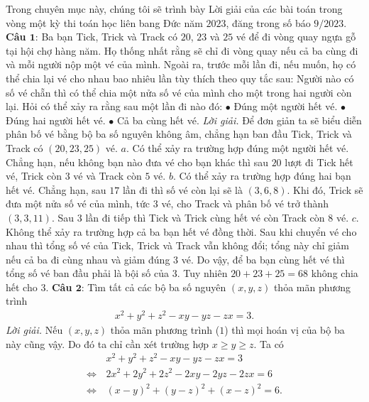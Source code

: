 \begin{multicols}{2}
	Trong chuyên mục này, chúng tôi sẽ trình bày Lời giải của các bài toán trong vòng một kỳ thi toán học liên bang Đức năm $2023$, đăng trong số báo $9/2023$. 
	\vskip 0.1cm
	\textbf{\color{cackithi}Câu $\pmb{1}$}: Ba bạn Tick, Trick và Track có $20$, $23$ và $25$ vé để đi vòng quay ngựa gỗ tại hội chợ hàng năm. Họ thống nhất rằng sẽ chỉ đi vòng quay nếu cả ba cùng đi và mỗi người nộp một vé của mình. Ngoài ra, trước mỗi lần đi, nếu muốn, họ có thể chia lại vé cho nhau bao nhiêu lần tùy thích theo quy tắc sau: Người nào có số vé chẵn thì có thể chia một nửa số vé của mình cho một trong hai người còn lại. Hỏi có thể xảy ra rằng sau một lần đi nào đó:
	\vskip 0.1cm
	$\bullet$ Đúng một người hết vé.
	\vskip 0.1cm
	$\bullet$ Đúng hai người hết vé.
	\vskip 0.1cm
	$\bullet$ Cả ba cùng hết vé. 
	\vskip 0.1cm
	\textit{Lời giải.}
	Để đơn giản ta sẽ biểu diễn phân bố vé bằng bộ ba số nguyên không âm, chẳng hạn ban đầu Tick, Trick và Track có $(20,23,25)$ vé.
	\vskip 0.1cm	
	$a.$ Có thể xảy ra trường hợp đúng một người hết vé. Chẳng hạn, nếu không bạn nào đưa vé cho bạn khác thì sau $20$ lượt đi Tick hết vé, Trick còn $3$ vé và Track còn $5$ vé.
	\vskip 0.1cm
	$b.$ Có thể xảy ra trường hợp đúng hai bạn hết vé. Chẳng hạn, sau $17$ lần đi thì số vé còn lại sẽ là $(3,6,8)$. Khi đó, Trick sẽ đưa một nửa số vé của mình, tức $3$ vé, cho Track và phân bố vé trở thành $(3,3,11)$. Sau $3$ lần đi tiếp thì Tick và Trick cùng hết vé còn Track còn $8$ vé.
	\vskip 0.1cm	
	$c.$ Không thể xảy ra trường hợp cả ba bạn hết vé đồng thời. Sau khi chuyển vé cho nhau thì tổng số vé của Tick, Trick và Track vẫn không đổi; tổng này chỉ giảm nếu cả ba đi cùng nhau và giảm đúng $3$ vé. Do vậy, để ba bạn cùng hết vé thì tổng số vé ban đầu phải là bội số của $3$. Tuy nhiên $20+23+25 = 68$ không chia hết cho $3$.
	\vskip 0.1cm
	\textbf{\color{cackithi}Câu $\pmb{2}$}: Tìm tất cả các bộ ba số nguyên $(x,y,z)$ thỏa mãn phương trình 
	\begin{align*}
		x^2 + y^2 + z^2 -xy-yz-zx = 3. \tag{$1$}
	\end{align*}
	\textit{Lời giải.}
	Nếu $(x,y,z)$ thỏa mãn phương trình ($1$) thì mọi hoán vị của bộ ba này cũng vậy. Do đó ta chỉ cần xét trường hợp $x \ge y \ge z$. Ta có
		\begin{align*} 
			&x^2 + y^2 + z^2 -xy-yz-zx  = 3 \\ 
			\Leftrightarrow	\,&2x^2 + 2y^2 + 2z^2 -2xy-2yz-2zx  = 6 \\
			\Leftrightarrow	\,&(x-y)^2 + (y-z)^2 + (x-z)^2  = 6. \tag{$2$}
		\end{align*}

\end{multicols}
